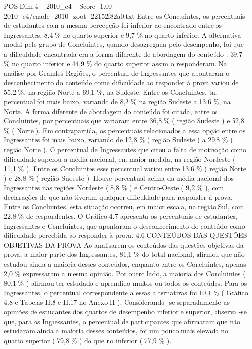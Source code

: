 \begin{textsample}{POS Dim 4 – 2010\_c4 – Score -1.00 – 2010\_c4/enade\_2010\_zoot\_22152f82a0.txt}
Entre os Concluintes, os percentuais de estudantes com a mesma percepção foi inferior ao encontrado entre os Ingressantes, 8,4 \% no quarto superior e 9,7 \% no quarto inferior.
A alternativa modal pelo grupo de Concluintes, quando desagregada pelo desempenho, foi que a dificuldade encontrada era a forma diferente de abordagem do conteúdo : 39,7 \% no quarto inferior e 44,9 \% do quarto superior assim o responderam.
Na análise por Grandes Regiões, o percentual de Ingressantes que apontaram o desconhecimento do conteúdo como dificuldade ao responder à prova variou de 55,2 \%, na região Norte a 69,1 \%, na Sudeste.
Entre os Concluintes, tal percentual foi mais baixo, variando de 8,2 \% na região Sudeste a 13,6 \%, na Norte.
A forma diferente de abordagem do conteúdo foi citada, entre os Concluintes, por percentuais que variaram entre 36,8 \% ( região Sudeste ) e 52,8 \% ( Norte ).
Em contrapartida, os percentuais relacionados a essa opção entre os Ingressantes foi mais baixo, variando de 12,8 \% ( região Sudeste ) a 29,8 \% ( região Norte ).
O percentual de Ingressantes que citou a falta de motivação como dificuldade superou a média nacional, em maior medida, na região Nordeste ( 11,1 \% ).
Entre os Concluintes esse percentual variou entre 13,6 \% ( região Norte ) e 28,8 \% ( região Sudeste ).
Houve percentual acima da média nacional dos Ingressantes nas regiões Nordeste ( 8,8 \% ) e Centro-Oeste ( 9,2 \% ), com declarações de que não tiveram qualquer dificuldade para responder à prova.
Entre os Concluintes, esta situação ocorreu, em maior escala, na região Sul, com 22,8 \% de respondentes.
O Gráfico 4.7 apresenta os percentuais de estudantes, Ingressantes e Concluintes, que apontaram o desconhecimento do conteúdo como dificuldade percebida ao responder à prova. 4.6 CONTEÚDOS DAS QUESTÕES OBJETIVAS DA PROVA Ao analisarem os conteúdos das questões objetivas da prova, a maior parte dos Ingressantes, 81,1 \% do total nacional, afirmou que não estudou ainda a maioria desses conteúdos, enquanto entre os Concluintes, apenas 2,0 \% expressaram a mesma opinião.
Por outro lado, a maioria dos Concluintes ( 80,1 \% ) afirmou ter estudado e aprendido muitos ou todos os conteúdos.
Para os Ingressantes, o percentual correspondente a essas alternativas foi 10,1 \% ( Gráfico 4.8 e Tabelas II.8 e II.17 no Anexo II ).
Considerando -se separadamente as opiniões de estudantes dos quartos de desempenho inferior e superior, observa -se que, para os Ingressantes, o percentual de participantes que afirmaram que não estudaram ainda a maioria desses conteúdos, foi um pouco mais elevado no quarto superior ( 79,8 \% ) do que no inferior ( 77,9 \% ).

\end{textsample}
